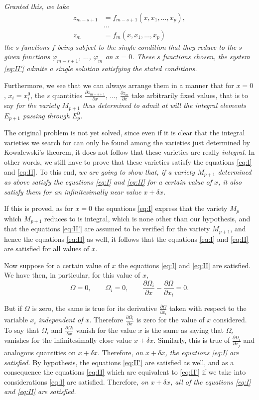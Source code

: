 \documentclass[leqno,11pt]{book}
\makeatletter
\newcommand{\pd}{\partial}
\theoremstyle{shape1}
\theoremstyle{shapesmall}
\let\old@phi\phi
\let\old@varphi\varphi
\let\phi\old@varphi
\let\varphi\old@phi
\makeatother
\begin{document}
\emph{Granted this, we take}
\begin{align*}
  z_{m-s+1}&=f_{m-s+1}(x,x_{1},\dots,x_{p}),\\
  &\dots\\
  z_{m}&=f_{m}(x,x_{1},\dots,x_{p})
\end{align*}
\emph{the $s$ functions $f$ being subject to the single condition that they reduce to the $s$ given functions $\phi_{m-s+1}$, $\dots$, $\phi_{m}$ on $x=0$. These $s$ functions chosen, the system \eqref{eq:II'} admite a single solution satisfying the stated conditions.}

Furthermore, we see that we can always arrange them in a manner that for $x=0$, $x_{i}=x_{i}^{0}$, the $s$ quantities $\frac{\pd z_{m-s+1}}{\pd x}$, $\dots$, $\frac{\pd z_{m}}{\pd x}$ take arbitrarily fixed values, that is to say \emph{for the variety $M_{p+1}$ thus determined to admit at will the integral elements $E_{p+1}$ passing through $E_{p}^{0}$.}

The original problem is not yet solved, since even if it is clear that the integral varieties we search for can only be found among the varieties just determined by Kowalewski's theorem, it does not follow that these varieties are really \emph{integral}. In other words, we still have to prove that these varieties satisfy the equations \eqref{eq:I} and \eqref{eq:II}. To this end, \emph{we are going to show that, if a variety $M_{p+1}$ determined as above satisfy the equations \eqref{eq:I} and \eqref{eq:II} for a certain value of $x$, it also satisfy them for an infinitesimally near value $x+\delta x$.}

If this is proved, as for $x=0$ the equations \eqref{eq:I} express that the variety $M_{p}$ which $M_{p+1}$ reduces to is integral, which is none other than our hypothesis, and that the equations \eqref{eq:II'} are assumed to be verified for the variety $M_{p+1}$, and hence the equations \eqref{eq:II} as well, it follows that the equations \eqref{eq:I} and \eqref{eq:II} are satisfied for all values of $x$.

Now suppose for a certain value of $x$ the equations \eqref{eq:I} and \eqref{eq:II} are satisfied. We have then, in particular, for this value of $x$,
\[
\Omega=0,\qquad\Omega_{i}=0,\qquad\frac{\pd\Omega_{i}}{\pd x}-\frac{\pd \Omega}{\pd x_{i}}=0.
\]

But if $\Omega$ is zero, the same is true for its derivative $\frac{\pd\Omega}{\pd x_{i}}$ taken with respect to the variable $x_{i}$ \emph{independent of $x$}. Therefore $\frac{\pd \Omega_{i}}{\pd x}$ is zero for the value of $x$ considered. To say that $\Omega_{i}$ and $\frac{\pd \Omega_{i}}{\pd x}$ vanish for the value $x$ is the same as saying that $\Omega_{i}$ vanishes for the infinitesimally close value $x+\delta x$. Similarly, this is true of $\frac{\pd\Omega_{i}}{\pd x_{j}}$ and analogous quantities on $x+\delta x$. Therefore, \emph{on $x+\delta x$, the equations \eqref{eq:I} are satisfied.} By hypothesis, the equations \eqref{eq:II'} are satisfied as well, and as a consequence the equations \eqref{eq:II} which are equivalent to \eqref{eq:II'} if we take into considerations \eqref{eq:I} are satisfied. Therefore, \emph{on $x+\delta x$, all of the equations \eqref{eq:I} and \eqref{eq:II} are satisfied.}
\end{document}
